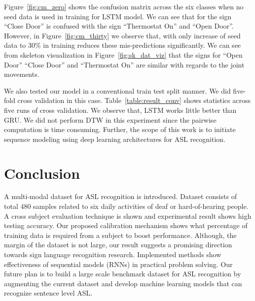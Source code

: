 \documentclass[10pt,twocolumn,letterpaper]{article}
\begin{document}
Figure~\ref{fig:cm_zero} shows the 
 confusion matrix  across the six classes when no seed data is used in training for LSTM model. We can see that for the 
 sign ``Close Door'' is confused with the sign ``Thermostat On'' and ``Open Door''. However, in Figure~\ref{fig:cm_thirty} we observe that, with only increase of seed data to 30\% in training  reduces these mis-predictions significantly. We can see from skeleton visualization in Figure~\ref{fig:sk_dat_viz} that the signs for ``Open Door''
 ``Close Door'' and ``Thermostat On'' are  similar with regards to the joint movements. 
 
 
We also tested our model in a  conventional train test split manner. 
We did five-fold cross validation in this case. Table~\ref{table:result_conv} shows statistics across five runs of cross validation. We observe that, LSTM works little better than GRU.
We did not perform DTW in this experiment since the pairwise computation is time consuming. Further, the scope of  this work is to initiate sequence modeling using deep learning architectures for ASL recognition.

 
\section{Conclusion}
A multi-modal dataset for ASL recognition is introduced. Dataset consists of total 480 samples related to six daily activities of deaf or hard-of-hearing people. A cross subject evaluation technique is shown and experimental result shows high testing accuracy. Our proposed calibration mechanism shows what percentage of training data is required from a subject to boost performance. Although, the margin of the dataset is not large, our result suggests a promising direction towards sign language recognition research. Implemented methods show effectiveness of sequential models (RNNs) in practical problem solving. Our future plan is to build a large scale benchmark dataset for ASL recognition by augmenting the current dataset and develop machine learning models that can recognize sentence level ASL.




{\small


}
\end{document}
